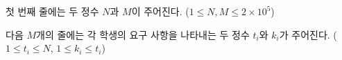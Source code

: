 첫 번째 줄에는 두 정수 $N$과 $M$이 주어진다. ($1 \le N, M \le 2 \times 10^5$)

다음 $M$개의 줄에는 각 학생의 요구 사항을 나타내는 두 정수 $t_i$와 $k_i$가 주어진다. ($1 \le t_i \le N$, $1 \le k_i \le t_i$)